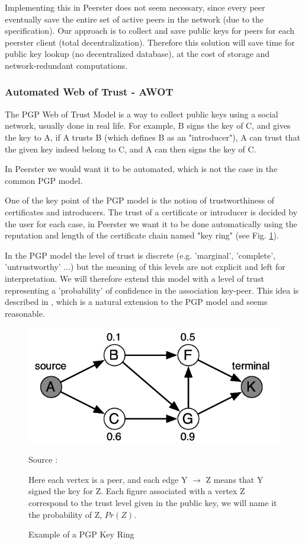 \documentclass[]{article}
\begin{document}
Implementing this in Peerster does not seem necessary, since every peer eventually save the entire set of active peers in the network (due to the specification). Our approach is to collect and save public keys for peers for each peerster client (total decentralization). Therefore this solution will save time for public key lookup (no decentralized database), at the cost of storage and network-redundant computations.

\subsubsection{Automated Web of Trust - AWOT}
\label{sec:related-work-wot}

The PGP Web of Trust Model \cite{abdul1997pgp} is a way to collect public keys using a social network, usually done in real life. For example, B signs the key of C, and gives the key to A, if A trusts B (which defines B as an "introducer"), A can trust that the given key indeed belong to C, and A can then signs the key of C. 

In Peerster we would want it to be automated, which is not the case in the common PGP model. 

One of the key point of the PGP model is the notion of trustworthiness of certificates and introducers. The trust of a certificate or introducer is decided by the user for each case, in Peerster we want it to be done automatically using the reputation and length of the certificate chain named "key ring" (see Fig. \ref{fig:pgp-key-ring}).

In the PGP model the level of trust is discrete (e.g. 'marginal', 'complete', 'untrustworthy' ...) but the meaning of this levels are not explicit and left for interpretation. We will therefore extend this model with a level of trust representing a 'probability' of confidence in the association key-peer. This idea is described in \cite{haenni2007new}, which is a natural extension to the PGP model and seems reasonable.

\begin{figure}[h]
\includegraphics{pgp-key-ring}
\centering
\caption{Example of a PGP Key Ring}
\label{fig:pgp-key-ring}
Source : \cite{haenni2007new}

Here each vertex is a peer, and each edge Y $\rightarrow$ Z means that Y signed the key for Z.
Each figure associated with a vertex Z  correspond to the trust level given in the public key, we will name it the probability of Z, $Pr(Z)$.
\end{figure}
\end{document}
